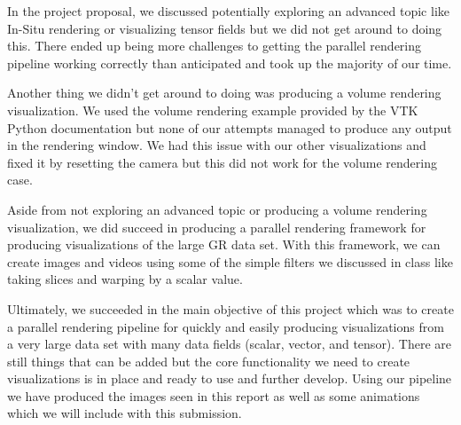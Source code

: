 In the project proposal, we discussed potentially exploring an advanced topic like In-Situ rendering or visualizing tensor fields but we did not get around to doing this. There ended up being more challenges to getting the parallel rendering pipeline working correctly than anticipated and took up the majority of our time.

Another thing we didn't get around to doing was producing a volume rendering visualization. We used the volume rendering example provided by the VTK Python documentation but none of our attempts managed to produce any output in the rendering window. We had this issue with our other visualizations and fixed it by resetting the camera but this did not work for the volume rendering case. 

Aside from not exploring an advanced topic or producing a volume rendering visualization, we did succeed in producing a parallel rendering framework for producing visualizations of the large GR data set. With this framework, we can create images and videos using some of the simple filters we discussed in class like taking slices and warping by a scalar value.

Ultimately, we succeeded in the main objective of this project which was to create a parallel rendering pipeline for quickly and easily producing visualizations from a very large data set with many data fields (scalar, vector, and tensor). There are still things that can be added but the core functionality we need to create visualizations is in place and ready to use and further develop. Using our pipeline we have produced the images seen in this report as well as some animations which we will include with this submission.
